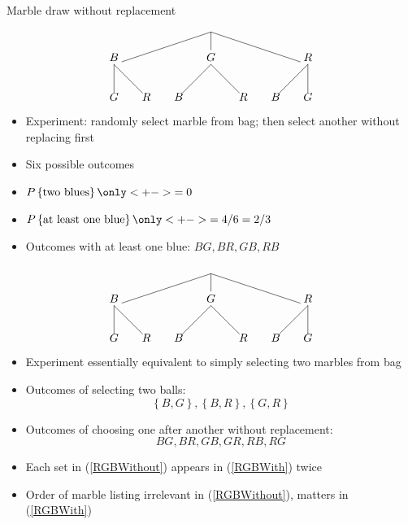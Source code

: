 \documentclass[handout]{beamer}
\theoremstyle{definition}
\begin{document}
\begin{frame}{Marble draw without replacement}
\[\begin{xy}<1cm,0cm>:
(0,0)="0";
(-3,-1)="-31";
(0,-1)="01";
(3,-1)="31";
"0";"-31"*+!D{B}**\dir{-};
"0";"01"*+!D{G}**\dir{-};
"0";"31"*+!D{R}**\dir{-};
"-31";(-3,-2)*{G}**\dir{-};
"-31";(-2,-2)*{R}**\dir{-};
"01";(-1,-2)*{B}**\dir{-};
"01";(1,-2)*{R}**\dir{-};
"31";(2,-2)*{B}**\dir{-};
"31";(3,-2)*{G}**\dir{-};
\end{xy}\]
\begin{itemize}
\item Experiment: randomly select marble from bag;
then select another \alert{without replacing} first
\item Six possible outcomes
\item $P\left\{\text{two blues}\right\}
\only<+->{=0}$
\item $P\left\{\text{at least one blue}\right\}
\only<+->{=4/6=2/3}$
\item Outcomes with at least one blue:
$BG,BR,GB,RB$
\end{itemize}
\end{frame}

\begin{frame}
\[\begin{xy}<1cm,0cm>:
(0,0)="0";
(-3,-1)="-31";
(0,-1)="01";
(3,-1)="31";
"0";"-31"*+!D{B}**\dir{-};
"0";"01"*+!D{G}**\dir{-};
"0";"31"*+!D{R}**\dir{-};
"-31";(-3,-2)*{G}**\dir{-};
"-31";(-2,-2)*{R}**\dir{-};
"01";(-1,-2)*{B}**\dir{-};
"01";(1,-2)*{R}**\dir{-};
"31";(2,-2)*{B}**\dir{-};
"31";(3,-2)*{G}**\dir{-};
\end{xy}\]
\begin{itemize}
\item Experiment \alert{essentially} equivalent to simply
selecting two marbles from bag
\item Outcomes of selecting two balls:
\begin{equation}\label{RGBWithout}
\left\{B,G\right\},\left\{B,R\right\},\left\{G,R\right\}
\end{equation}
\item Outcomes of choosing one after another without replacement:
\begin{equation}\label{RGBWith}
BG,BR,GB,GR,RB,RG
\end{equation}
\item Each set in (\ref{RGBWithout}) appears in
(\ref{RGBWith}) \alert{twice}
\item Order of marble listing irrelevant in
(\ref{RGBWithout}), matters in (\ref{RGBWith})
\end{itemize}
\end{frame}
\end{document}
